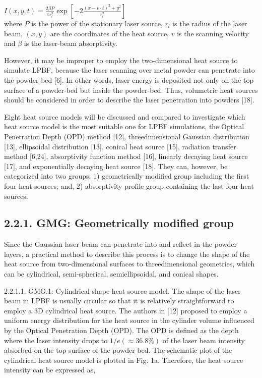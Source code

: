 \documentclass[10pt]{article}
\begin{document}
$I(x, y, t)=\frac{2 \beta P}{\pi r_{l}^{2}} \exp \left[-2 \frac{(x-v \cdot t)^{2}+y^{2}}{r_{l}^{2}}\right]$\\
where $P$ is the power of the stationary laser source, $r_{l}$ is the radius of the laser beam, $(x, y)$ are the coordinates of the heat source, $v$ is the scanning velocity and $\beta$ is the laser-beam absorptivity.

However, it may be improper to employ the two-dimensional heat source to simulate LPBF, because the laser scanning over metal powder can penetrate into the powder-bed [6]. In other words, laser energy is deposited not only on the top surface of a powder-bed but inside the powder-bed. Thus, volumetric heat sources should be considered in order to describe the laser penetration into powders [18].

Eight heat source models will be discussed and compared to investigate which heat source model is the most suitable one for LPBF simulations, the Optical Penetration Depth (OPD) method [12], threedimensional Gaussian distribution [13], ellipsoidal distribution [13], conical heat source [15], radiation transfer method [6,24], absorptivity function method [16], linearly decaying heat source [17], and exponentially decaying heat source [18]. They can, however, be categorized into two groups: 1) geometrically modified group including the first four heat sources; and, 2) absorptivity profile group containing the last four heat sources.

\subsection*{2.2.1. GMG: Geometrically modified group}
Since the Gaussian laser beam can penetrate into and reflect in the powder layers, a practical method to describe this process is to change the shape of the heat source from two-dimensional surfaces to threedimensional geometries, which can be cylindrical, semi-spherical, semiellipsoidal, and conical shapes.

2.2.1.1. GMG.1: Cylindrical shape heat source model. The shape of the laser beam in LPBF is usually circular so that it is relatively straightforward to employ a 3D cylindrical heat source. The authors in [12] proposed to employ a uniform energy distribution for the heat source in the cylinder volume influenced by the Optical Penetration Depth (OPD). The OPD is defined as the depth where the laser intensity drops to $1 / e(\approx 36.8 \%)$ of the laser beam intensity absorbed on the top surface of the powder-bed. The schematic plot of the cylindrical heat source model is plotted in Fig. 1a. Therefore, the heat source intensity can be expressed as,
\end{document}
